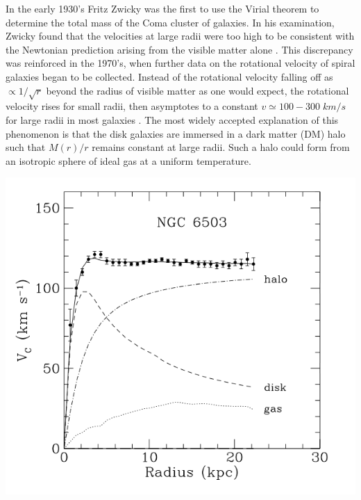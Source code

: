 \documentclass[a4paper,12pt]{article}
\begin{document}
In the early 1930's Fritz Zwicky was the first to use the Virial theorem to determine the total mass of the Coma cluster of galaxies.  In his examination, Zwicky found that the velocities at large radii were too high to be consistent with the Newtonian prediction arising from the visible matter alone \cite{Zwicky}. This discrepancy was reinforced in the 1970's, when further data on the rotational velocity of spiral galaxies began to be collected.  Instead of the rotational velocity falling off as $\propto 1/\sqrt{r}$ beyond the radius of visible matter as one would expect, the rotational velocity rises for small radii, then asymptotes to a constant $ v \simeq 100-300 \; km/s $ for large radii in most galaxies \cite{Persic,Battaner,Binney}.  The most widely accepted explanation of this phenomenon is that the disk galaxies are immersed in a dark matter (DM) halo such that $ M(r)/r $ remains constant at large radii.  Such a halo could form from an isotropic sphere of ideal gas at a uniform temperature.

\begin{center}
\includegraphics[scale=.7]{RotationCurve2.png}
\end{center}
\end{document}
